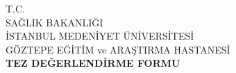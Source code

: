 



\renewcommand*{\LayoutTextField}[2]{\makebox[1em][l]{#1 }%
   \raisebox{\baselineskip}{\raisebox{-\height}{#2}}}


\begin{center}
T.C.\\
SAĞLIK BAKANLIĞI\\
İSTANBUL MEDENİYET ÜNİVERSİTESİ\\
GÖZTEPE EĞİTİM ve ARAŞTIRMA HASTANESİ\\[2mm]
{\small \textbf{TEZ DEĞERLENDİRME FORMU}}
\end{center}

